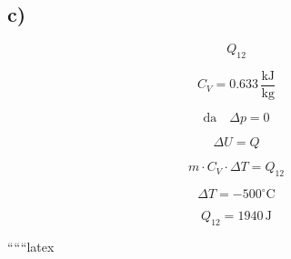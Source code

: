 

\subsection*{c)}
\[ Q_{12} \]

\[ C_V = 0.633 \, \frac{\text{kJ}}{\text{kg}} \]

\[ \text{da} \quad \Delta p = 0 \]

\[ \Delta U = Q \]

\[ m \cdot C_V \cdot \Delta T = Q_{12} \]

\[ \Delta T = -500^\circ \text{C} \]

\[ Q_{12} = 1940 \, \text{J} \]

``````latex